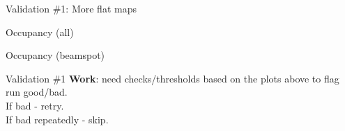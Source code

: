 \documentclass[xcolor=table]{beamer}
\begin{document}
\begin{frame}{Validation \#1: More flat maps}
\begin{minipage}{0.5\textwidth}
\noindent{}
\center Occupancy (all)
\end{minipage}%
\begin{minipage}{0.5\textwidth}
\noindent{}
\center Occupancy (beamspot)
\end{minipage}
\end{frame}

\begin{frame}{Validation \#1}
\textbf{Work}: need checks/thresholds based on the plots above to flag run good/bad. \\
If bad - retry. \\
If bad repeatedly - skip.
\end{frame}
\end{document}
